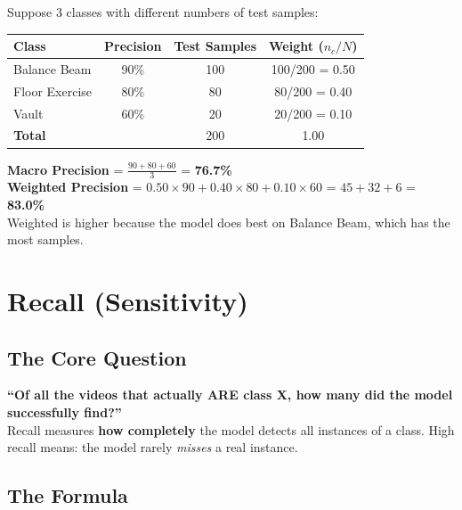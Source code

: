 \documentclass[12pt, a4paper]{article}
\begin{document}
\begin{examplebox}
Suppose 3 classes with different numbers of test samples:

\begin{center}
\begin{tabular}{lccc}
\toprule
\textbf{Class} & \textbf{Precision} & \textbf{Test Samples} & \textbf{Weight ($n_c/N$)} \\
\midrule
Balance Beam & 90\% & 100 & 100/200 = 0.50 \\
Floor Exercise & 80\% & 80 & 80/200 = 0.40 \\
Vault & 60\% & 20 & 20/200 = 0.10 \\
\midrule
\textbf{Total} & & 200 & 1.00 \\
\bottomrule
\end{tabular}
\end{center}

\textbf{Macro Precision} = $\frac{90 + 80 + 60}{3}$ = \textbf{76.7\%}\\[0.2cm]
\textbf{Weighted Precision} = $0.50 \times 90 + 0.40 \times 80 + 0.10 \times 60$ = $45 + 32 + 6$ = \textbf{83.0\%}\\[0.3cm]
Weighted is higher because the model does best on Balance Beam, which has the most samples.
\end{examplebox}


\newpage
\section{Recall (Sensitivity)}

\subsection{The Core Question}

\begin{keyidea}
\textbf{``Of all the videos that actually ARE class X, how many did the model successfully find?''}\\[0.3cm]
Recall measures \textbf{how completely} the model detects all instances of a class. High recall means: the model rarely \textit{misses} a real instance.
\end{keyidea}

\subsection{The Formula}
\end{document}
